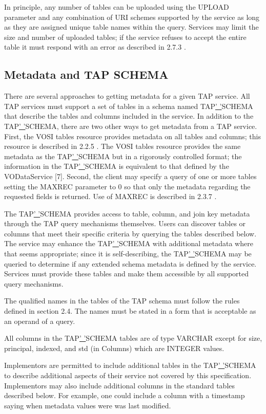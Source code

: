 \documentclass[11pt,a4paper]{ivoa}
\begin{document}
In principle, any number of tables can be uploaded using the UPLOAD parameter 
and any combination of URI schemes supported by the service as long as they are 
assigned unique table names within the query. Services may limit the size and 
number of uploaded tables; if the service refuses to accept the entire table it 
must respond with an error as described in 2.7.3 .

\subsection{Metadata and TAP SCHEMA}
There are several approaches to getting metadata for a given TAP service. All 
TAP services must support a set of tables in a schema named 
TAP\underline{' '}SCHEMA that describe the tables and columns included in the 
service. In addition to the TAP\underline{' '}SCHEMA, there are two other ways 
to get metadata from a TAP service. First, the VOSI tables resource provides 
metadata on all tables and columns; this resource is described in 2.2.5 . The 
VOSI tables resource provides the same metadata as the TAP\underline{' '}SCHEMA 
but in a rigorously controlled format; the information in the 
TAP\underline{' '}SCHEMA is equivalent to that defined by the  VODataService 
[7]. Second, the client may specify a query of one or more tables setting the 
MAXREC parameter to 0 so that only the metadata regarding the requested fields 
is returned. Use of MAXREC is described in 2.3.7 .

The TAP\underline{' '}SCHEMA provides access to table, column, and join key 
metadata through the TAP query mechanisms themselves. Users can discover tables 
or columns that meet their specific criteria by querying the tables described 
below.  The service may enhance the TAP\underline{' '}SCHEMA with additional 
metadata where that seems appropriate; since it is self-describing, the 
TAP\underline{' '}SCHEMA may be queried to determine if any extended schema 
metadata is defined by the service. Services must provide these tables and make 
them accessible by all supported query mechanisms.

The qualified names in the tables of the TAP schema must follow the rules 
defined in section 2.4. The names must be stated in a form that is acceptable as 
an operand of a query.

All columns in the TAP\underline{' '}SCHEMA tables are of type VARCHAR except 
for size,  principal, indexed, and std (in Columns) which are INTEGER values.

Implementors are permitted to include additional tables in the 
TAP\underline{' '}SCHEMA to describe additional aspects of their service not 
covered by this specification. Implementors may also include additional columns 
in the standard tables described below. For example, one could include a column 
with a timestamp saying when metadata values were was last modified.
\end{document}
